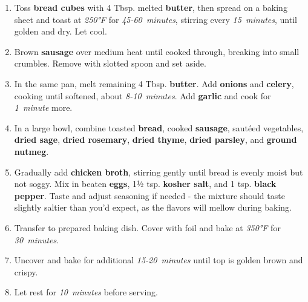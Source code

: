 \documentclass[11pt,letterpaper]{article}
\begin{document}
\begin{enumerate}
    \item Toss \textbf{bread cubes} with 4 Tbsp. melted \textbf{butter}, then spread on a baking sheet and toast at \textit{250°F} for \textit{45-60~minutes}, stirring every \textit{15~minutes}, until golden and dry. Let cool.
    
    \item Brown \textbf{sausage} over medium heat until cooked through, breaking into small crumbles. Remove with slotted spoon and set aside.
    
    \item In the same pan, melt remaining 4 Tbsp. \textbf{butter}. Add \textbf{onions} and \textbf{celery}, cooking until softened, about \textit{8-10~minutes}. Add \textbf{garlic} and cook for \textit{1~minute} more.
    
    \item In a large bowl, combine toasted \textbf{bread}, cooked \textbf{sausage}, sautéed vegetables, \textbf{dried sage}, \textbf{dried rosemary}, \textbf{dried thyme}, \textbf{dried parsley}, and \textbf{ground nutmeg}.
    
    \item Gradually add \textbf{chicken broth}, stirring gently until bread is evenly moist but not soggy. Mix in beaten \textbf{eggs}, 1½ tsp. \textbf{kosher salt}, and 1 tsp. \textbf{black pepper}. Taste and adjust seasoning if needed - the mixture should taste slightly saltier than you'd expect, as the flavors will mellow during baking.
    
    \item Transfer to prepared baking dish. Cover with foil and bake at \textit{350°F} for \textit{30~minutes}.
    
    \item Uncover and bake for additional \textit{15-20~minutes} until top is golden brown and crispy.
    
    \item Let rest for \textit{10~minutes} before serving.
\end{enumerate}

\newpage
\end{document}
